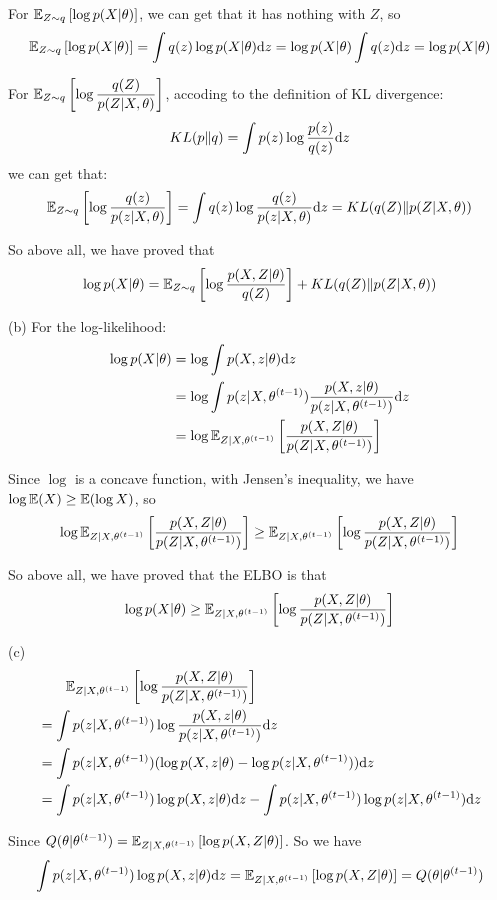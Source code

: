 For $\mathbb{E}_{Z\sim q}\left [\log p(X|\theta)\right]$, we can get that it has nothing with $Z$, so
$$\mathbb{E}_{Z\sim q}\left [\log p(X|\theta)\right] = \int q(z)\log p(X|\theta)\mathrm{d}z=\log p(X|\theta)\int q(z)\mathrm{d}z = \log p(X|\theta)$$

For $\mathbb{E}_{Z\sim q}\left [\log\dfrac{q(Z)}{p(Z|X,\theta)}\right]$, accoding to the definition of KL divergence:
$$KL(p\|q)=\int p(z)\log\dfrac{p(z)}{q(z)}\mathrm{d}z$$
we can get that:
$$\mathbb{E}_{Z\sim q}\left [\log\dfrac{q(z)}{p(z|X,\theta)}\right] = \int q(z)\log\dfrac{q(z)}{p(z|X,\theta)}\mathrm{d}z = KL(q(Z)\|p(Z|X,\theta))$$

So above all, we have proved that
$$\log p(X|\theta)=\mathbb{E}_{Z\sim q}\left [\log\dfrac{p(X,Z|\theta)}{q(Z)}\right]+KL(q(Z)\|p(Z|X,\theta))$$

(b) For the log-likelihood:
\begin{align*}
\log p(X|\theta) &= \log\int p(X,z|\theta)\mathrm{d}z \\
&= \log\int p(z|X,\theta^{(t-1)})\dfrac{p(X,z|\theta)}{p(z|X,\theta^{(t-1)})}\mathrm{d}z \\
&= \log \mathbb{E}_{Z|X,\theta^{(t-1)}}\left[\dfrac{p(X,Z|\theta)}{p(Z|X,\theta^{(t-1)})}\right]
\end{align*}

Since $\log$ is a concave function, with Jensen's inequality, we have $\log \mathbb{E}(X)\geq \mathbb{E}(\log X)$, so
$$\log \mathbb{E}_{Z|X,\theta^{(t-1)}}\left[\dfrac{p(X,Z|\theta)}{p(Z|X,\theta^{(t-1)})}\right]
\geq \mathbb{E}_{Z|X,\theta^{(t-1)}}\left[\log \dfrac{p(X,Z|\theta)}{p(Z|X,\theta^{(t-1)})}\right]$$

So above all, we have proved that the ELBO is that
$$\log p(X|\theta)\geq\mathbb{E}_{Z|X,\theta^{(t-1)}}\left[\log \dfrac{p(X,Z|\theta)}{p(Z|X,\theta^{(t-1)})}\right]$$

(c) \begin{align*}
&\qquad \mathbb{E}_{Z|X,\theta^{(t-1)}}\left[\log \dfrac{p(X,Z|\theta)}{p(Z|X,\theta^{(t-1)})}\right] \\
&= \int p(z|X,\theta^{(t-1)})\log \dfrac{p(X,z|\theta)}{p(z|X,\theta^{(t-1)})}\mathrm{d}z \\
&= \int p(z|X,\theta^{(t-1)})(\log p(X,z|\theta) - \log  p(z|X,\theta^{(t-1)}))\mathrm{d}z \\
&= \int p(z|X,\theta^{(t-1)})\log p(X,z|\theta)\mathrm{d}z-\int p(z|X,\theta^{(t-1)})\log p(z|X,\theta^{(t-1)})\mathrm{d}z
\end{align*}

Since $Q(\theta|\theta^{(t-1)})=\mathbb{E}_{Z|X,\theta^{(t-1)}}\left[\log p(X,Z|\theta)\right]$. So we have
$$\int p(z|X,\theta^{(t-1)})\log p(X,z|\theta)\mathrm{d}z=\mathbb{E}_{Z|X,\theta^{(t-1)}}\left[\log p(X,Z|\theta)\right]=Q(\theta|\theta^{(t-1)})$$

